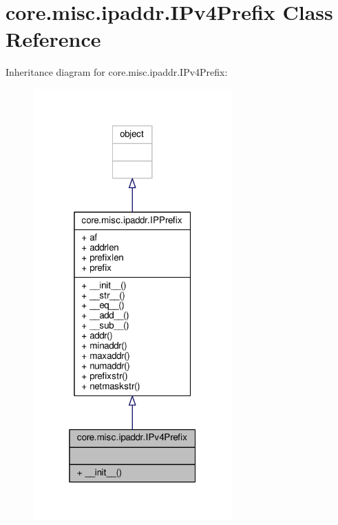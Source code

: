\hypertarget{classcore_1_1misc_1_1ipaddr_1_1_i_pv4_prefix}{\section{core.\+misc.\+ipaddr.\+I\+Pv4\+Prefix Class Reference}
\label{classcore_1_1misc_1_1ipaddr_1_1_i_pv4_prefix}
}


Inheritance diagram for core.\+misc.\+ipaddr.\+I\+Pv4\+Prefix\+:
\nopagebreak
\begin{figure}[H]
\begin{center}
\leavevmode
\includegraphics[width=217pt]{classcore_1_1misc_1_1ipaddr_1_1_i_pv4_prefix__inherit__graph}
\end{center}
\end{figure}


